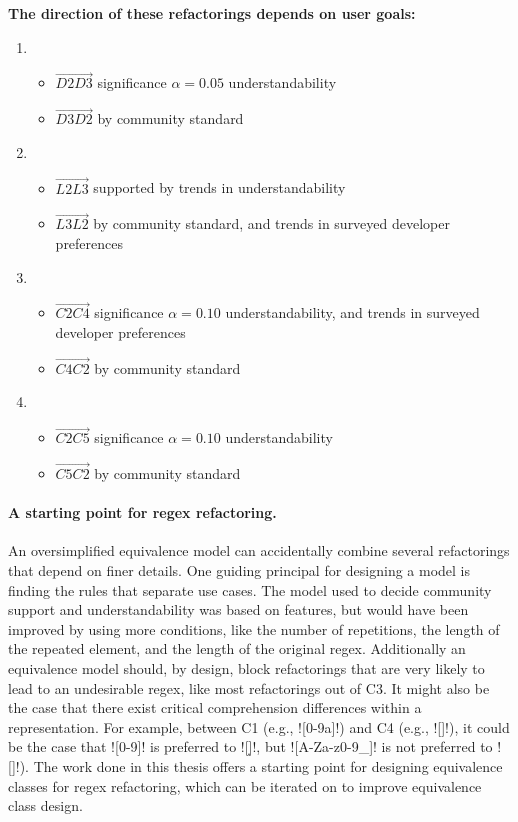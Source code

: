 \textbf{The direction of these refactorings depends on user goals:}
\begin{enumerate}
\item \begin{itemize}
\item   $\overrightarrow{D2 D3}$ significance $\alpha=0.05$ understandability
\item   $\overrightarrow{D3 D2}$ by community standard
\end{itemize}
\item \begin{itemize}
\item   $\overrightarrow{L2 L3}$ supported by trends in understandability
\item   $\overrightarrow{L3 L2}$ by community standard, and trends in surveyed developer preferences
\end{itemize}
\item \begin{itemize}
\item   $\overrightarrow{C2 C4}$ significance $\alpha=0.10$ understandability, and trends in surveyed developer preferences
\item   $\overrightarrow{C4 C2}$ by community standard
\end{itemize}
\item \begin{itemize}
\item   $\overrightarrow{C2 C5}$ significance $\alpha=0.10$ understandability
\item   $\overrightarrow{C5 C2}$ by community standard
\end{itemize}
\end{enumerate}


\paragraph{A starting point for regex refactoring.}  An oversimplified equivalence model can accidentally combine several refactorings that depend on finer details.  One guiding principal for designing a model is finding the rules that separate use cases.  The model used to decide community support and understandability was based on features, but would have been improved by using more conditions, like the number of repetitions, the length of the repeated element, and the length of the original regex.  Additionally an equivalence model should, by design, block refactorings that are very likely to lead to an undesirable regex, like most refactorings out of C3.  It might also be the case that there exist critical comprehension differences within a representation. For example, between C1 (e.g., \cverb![0-9a]!) and C4 (e.g., \cverb![\da]!), it could be the case that \cverb![0-9]! is preferred to \cverb![\d]!, but \cverb![A-Za-z0-9_]! is not preferred to \cverb![\w]!). The work done in this thesis offers a starting point for designing equivalence classes for regex refactoring, which can be iterated on to improve equivalence class design.


